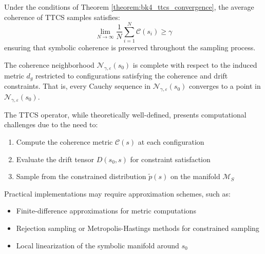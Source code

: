 \begin{corollary}
\label{corollary:bk4_coherence_preservation}
Under the conditions of Theorem \ref{theorem:bk4_ttcs_convergence}, the average coherence of TTCS samples satisfies:
\[
\lim_{N \to \infty} \frac{1}{N} \sum_{i=1}^N \mathcal{C}(s_i) \geq \gamma
\]
ensuring that symbolic coherence is preserved throughout the sampling process.
\end{corollary}

\begin{proposition}
\label{proposition:bk4_neighborhood_completeness}
The coherence neighborhood $\mathcal{N}_{\gamma,\varepsilon}(s_0)$ is complete with respect to the induced metric $d_g$ restricted to configurations satisfying the coherence and drift constraints. That is, every Cauchy sequence in $\mathcal{N}_{\gamma,\varepsilon}(s_0)$ converges to a point in $\mathcal{N}_{\gamma,\varepsilon}(s_0)$.
\end{proposition}

\begin{remark}
\label{remark:bk4_computational_complexity}
The TTCS operator, while theoretically well-defined, presents computational challenges due to the need to:
\begin{enumerate}
\item Compute the coherence metric $\mathcal{C}(s)$ at each configuration
\item Evaluate the drift tensor $D(s_0, s)$ for constraint satisfaction
\item Sample from the constrained distribution $\tilde{p}(s)$ on the manifold $\mathcal{M}_S$
\end{enumerate}

Practical implementations may require approximation schemes, such as:
\begin{itemize}
\item Finite-difference approximations for metric computations
\item Rejection sampling or Metropolis-Hastings methods for constrained sampling
\item Local linearization of the symbolic manifold around $s_0$
\end{itemize}
\end{remark}


